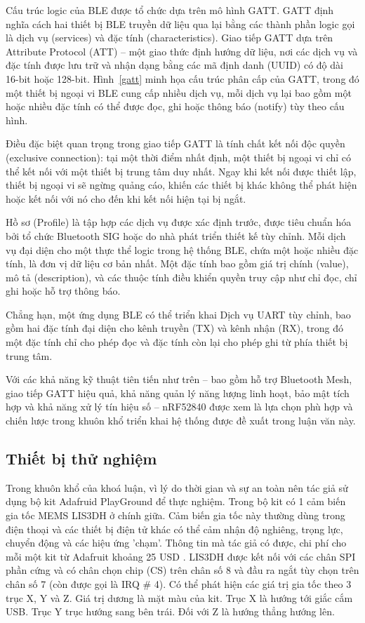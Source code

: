 Cấu trúc logic của BLE được tổ chức dựa trên mô hình GATT. GATT định nghĩa cách hai thiết bị BLE truyền dữ liệu qua lại bằng các thành phần logic gọi là dịch vụ (services) và đặc tính (characteristics). Giao tiếp GATT dựa trên Attribute Protocol (ATT) – một giao thức định hướng dữ liệu, nơi các dịch vụ và đặc tính được lưu trữ và nhận dạng bằng các mã định danh (UUID) có độ dài 16-bit hoặc 128-bit. Hình~\ref{gatt} minh họa cấu trúc phân cấp của GATT, trong đó một thiết bị ngoại vi BLE cung cấp nhiều dịch vụ, mỗi dịch vụ lại bao gồm một hoặc nhiều đặc tính có thể được đọc, ghi hoặc thông báo (notify) tùy theo cấu hình.

Điều đặc biệt quan trọng trong giao tiếp GATT là tính chất kết nối độc quyền (exclusive connection): tại một thời điểm nhất định, một thiết bị ngoại vi chỉ có thể kết nối với một thiết bị trung tâm duy nhất. Ngay khi kết nối được thiết lập, thiết bị ngoại vi sẽ ngừng quảng cáo, khiến các thiết bị khác không thể phát hiện hoặc kết nối với nó cho đến khi kết nối hiện tại bị ngắt.

Hồ sơ (Profile) là tập hợp các dịch vụ được xác định trước, được tiêu chuẩn hóa bởi tổ chức Bluetooth SIG hoặc do nhà phát triển thiết kế tùy chỉnh. Mỗi dịch vụ đại diện cho một thực thể logic trong hệ thống BLE, chứa một hoặc nhiều đặc tính, là đơn vị dữ liệu cơ bản nhất. Một đặc tính bao gồm giá trị chính (value), mô tả (description), và các thuộc tính điều khiển quyền truy cập như chỉ đọc, chỉ ghi hoặc hỗ trợ thông báo.

Chẳng hạn, một ứng dụng BLE có thể triển khai Dịch vụ UART tùy chỉnh, bao gồm hai đặc tính đại diện cho kênh truyền (TX) và kênh nhận (RX), trong đó một đặc tính chỉ cho phép đọc và đặc tính còn lại cho phép ghi từ phía thiết bị trung tâm.

Với các khả năng kỹ thuật tiên tiến như trên – bao gồm hỗ trợ Bluetooth Mesh, giao tiếp GATT hiệu quả, khả năng quản lý năng lượng linh hoạt, bảo mật tích hợp và khả năng xử lý tín hiệu số – nRF52840 được xem là lựa chọn phù hợp và chiến lược trong khuôn khổ triển khai hệ thống được đề xuất trong luận văn này.


\subsection{Thiết bị thử nghiệm}
Trong khuôn khổ của khoá luận, vì lý do thời gian và sự an toàn nên tác giả sử dụng bộ kit Adafruid PlayGround để thực nghiệm. Trong bộ kit có 1 cảm biến gia tốc MEMS LIS3DH ở chính giữa. Cảm biến gia tốc này thường dùng trong điện thoại và các thiết bị điện tử khác có thể cảm nhận độ nghiêng, trọng lực, chuyển động và các hiệu ứng 'chạm'. Thông tin mà tác giả có được, chi phí cho mỗi một kit từ Adafruit khoảng 25 USD \cite{ada_price}. LIS3DH được kết nối với các chân SPI phần cứng và có chân chọn chip (CS) trên chân số 8 và đầu ra ngắt tùy chọn trên chân số 7 (còn được gọi là IRQ # 4). Có thể phát hiện các giá trị gia tốc theo 3 trục X, Y và Z. Giá trị dương là mặt màu của kit. Trục X là hướng tới giắc cắm USB. Trục Y trục hướng sang bên trái. Đối với Z là hướng thẳng hướng lên.

